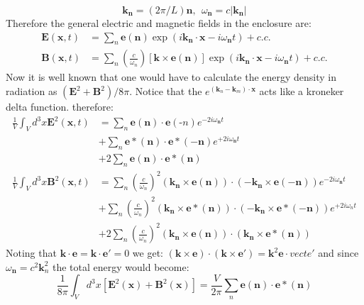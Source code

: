 \documentclass[9pt,a4paper, twocolumn]{article}
\newcommand{\vect}[1]{\textbf{#1}}
\begin{document}
            \begin{equation}
                \vect k_{\vect n} = (2\pi/L)\vect n, \ \ \omega_{\vect n} = c |\vect k_{\vect n}|
            \end{equation}
            Therefore the general electric and magnetic fields in the enclosure are:
            \begin{align}
                \vect E(\vect x, t) &= \sum_n \vect e(\vect n) \exp(i\vect k_{\vect n}\cdot \vect x - i\omega_{\vect n}t) + c.c.\\
                \vect B(\vect x,t) &= \sum_n \left(\frac c{\omega_n}\right)\left[\vect k\times \vect e(\vect n)\right]\exp(i\vect k_{\vect n}\cdot \vect x - i\omega_{\vect n} t) + c.c.
            \end{align}
            Now it is well known that one would have to calculate the energy density in radiation as $(\vect E^2 + \vect B^2)/8\pi$. Notice that the $e^{(\vect k_n - \vect k_m)\cdot \vect x}$ acts like a kroneker delta function. therefore:
            \begin{align*}
                \frac 1V \int_V d^3x \vect E^2(\vect x , t) &= \sum_n \vect e(\vect n) \cdot \vect e(\vect -n) e^{-2i\omega_{\vect n}t}\\
                & + \sum_n \vect e*(\vect n)\cdot \vect e*(-\vect n)e^{+2i\omega_{\vect n}t}\\
                & + 2\sum_n \vect e(\vect n)\cdot \vect e*(\vect n)\\
                \frac1V\int_V d^3x\vect B^2(\vect x, t) &= \sum_n \left( \frac c{\omega_n}\right)^2 (\vect k_{\vect n}\times \vect e(\vect n))\cdot (-\vect k_{\vect n}\times\vect e(-\vect n))e^{-2i\omega_{\vect n}t}\\
                & + \sum_n \left( \frac c{\omega_n}\right)^2(\vect k_{\vect n } \times \vect e*(\vect n))\cdot (-\vect k_{\vect n }\times \vect e*(-\vect n))e^{+2i\omega_n t}\\
                &+2 \sum_n \left( \frac c{\omega_n}\right)^2(\vect k_{\vect n}\times\vect e(\vect n))\cdot(\vect k_{\vect n}\times \vect e*(\vect n))
            \end{align*}
            Noting that $\vect k\cdot \vect e = \vect k\cdot \vect e' = 0$ we get: $(\vect k\times \vect e)\cdot(\vect k\times \vect e') = \vect k^2 \vect e\cdot vect e'$ and since $\omega_{\vect n} = c^2 \vect k^2_n$ the total energy would become:
            \begin{equation}
                \frac{1}{8\pi}\int_V d^3x \left[\vect E^2(\vect x) + \vect B^2(\vect x)\right] = \frac{V}{2\pi}\sum_n \vect e(\vect n)\cdot\vect e*(\vect n)
            \end{equation} 
\end{document}
